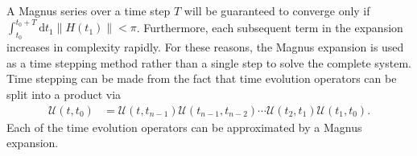 \documentclass{jors}
\begin{document}

		A Magnus series over a time step \(T\) will be guaranteed to converge only if \(\int_{t_0}^{t_0 + T}\mathrm{d}t_1\|H(t_1)\| < \pi\)\cite{blanes_magnus_2009}. Furthermore, each subsequent term in the expansion increases in complexity rapidly. For these reasons, the Magnus expansion is used as a time stepping method rather than a single step to solve the complete system. Time stepping can be made from the fact that time evolution operators can be split into a product via
		\begin{align}
			\mathcal{U}(t, t_0) &= \mathcal{U}(t, t_{n - 1})\mathcal{U}(t_{n - 1}, t_{n - 2})\cdots\mathcal{U}(t_2, t_1)\mathcal{U}(t_1, t_0).\label{eq:product_of_time_evolution}
		\end{align}
		Each of the time evolution operators can be approximated by a Magnus expansion.

\end{document}
